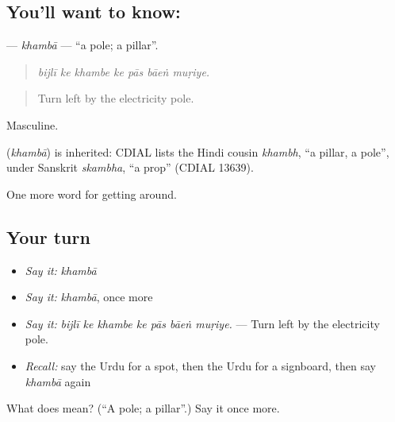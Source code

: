 \subsection*{You'll want to know: }
\textbf{} — \emph{khambā} — \textquotedblleft{}a pole; a pillar\textquotedblright{}.

\begin{quote}
      
\end{quote}

\begin{quote}
\emph{bijlī ke khambe ke pās bāeṅ muṛiye.}
\end{quote}

\begin{quote}
Turn left by the electricity pole.
\end{quote}

Masculine.

\begin{cousinweb}
\textbf{} (\emph{khambā}) is inherited: CDIAL lists the Hindi cousin \emph{khambh}, \textquotedblleft{}a pillar, a pole\textquotedblright{}, under Sanskrit \emph{skambha}, \textquotedblleft{}a prop\textquotedblright{} (CDIAL 13639).
\end{cousinweb}

\begin{grammarlens}[title={What you've built}]
One more word for getting around.
\end{grammarlens}

\subsection*{Your turn}
\begin{itemize}
\raggedright
  \item \emph{Say it:} \emph{khambā}
  \item \emph{Say it:} \emph{khambā}, once more
  \item \emph{Say it:} \emph{bijlī ke khambe ke pās bāeṅ muṛiye.} — Turn left by the electricity pole.
  \item \emph{Recall:} say the Urdu for a spot, then the Urdu for a signboard, then say \emph{khambā} again
\end{itemize}

\begin{tcolorbox}[breakable,colback=teal!4,colframe=teal!35!black,title={Before you move on}]
What does  mean? (\textquotedblleft{}A pole; a pillar\textquotedblright{}.) Say it once more.
\end{tcolorbox}
